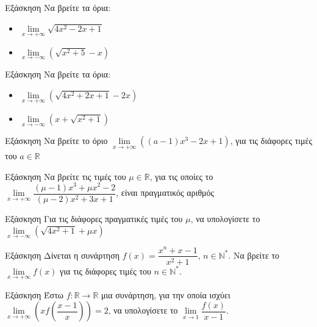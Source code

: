 \documentclass{presentation}
\begin{document}
\begin{frame}{Εξάσκηση}
      Να βρείτε τα όρια:
      \begin{itemize}
            \item $\lim\limits_{x \to +\infty}{ \sqrt{4x^2-2x+1} }$ \pause
            \item $\lim\limits_{x \to -\infty}{ \left( \sqrt{x^2+5} -x \right)  }$
      \end{itemize}
\end{frame}

\begin{frame}{Εξάσκηση}
      Να βρείτε τα όρια:
      \begin{itemize}
            \item $\lim\limits_{x \to +\infty}{ \left( \sqrt{4x^2+2x+1}-2x \right)  }$ \pause
            \item $\lim\limits_{x \to -\infty}{ \left( x+ \sqrt{x^2+1} \right)  }$
      \end{itemize}
\end{frame}

\begin{frame}{Εξάσκηση}
      Να βρείτε το όριο $\lim\limits_{x \to +\infty}{ \left( (a-1)x^3-2x+1 \right)  }$, για τις διάφορες τιμές του $a\in\mathbb{R}$
\end{frame}

\begin{frame}{Εξάσκηση}
      Να βρείτε τις τιμές του $μ\in\mathbb{R}$, για τις οποίες το $\lim\limits_{x \to +\infty}{ \dfrac{(μ-1)x^3+μx^2-2}{(μ-2)x^2+3x+1}  }$, είναι πραγματικός αριθμός
\end{frame}

\begin{frame}{Εξάσκηση}
      Για τις διάφορες πραγματικές τιμές του $μ$, να υπολογίσετε το $\lim\limits_{x \to -\infty}{ \left( \sqrt{4x^2+1}+μx \right)  }$
\end{frame}

\begin{frame}{Εξάσκηση}
      Δίνεται η συνάρτηση $f(x)=\dfrac{x^n+x-1}{x^2+1}$, $n\in\mathbb{N}^*$. Να βρείτε το $\lim\limits_{x \to +\infty}{ f(x) } $ για τις διάφορες τιμές του $n\in\mathbb{N}^*$.
\end{frame}

\begin{frame}{Εξάσκηση}
      Έστω $f:\mathbb{R}\to\mathbb{R}$ μια συνάρτηση, για την οποία ισχύει $\lim\limits_{x \to +\infty}{ \left( xf\left( \dfrac{x-1}{x} \right)  \right)  }=2$, να υπολογίσετε το $\lim\limits_{x \to 1}{ \dfrac{f(x)}{x-1} }$.
\end{frame}
\end{document}

